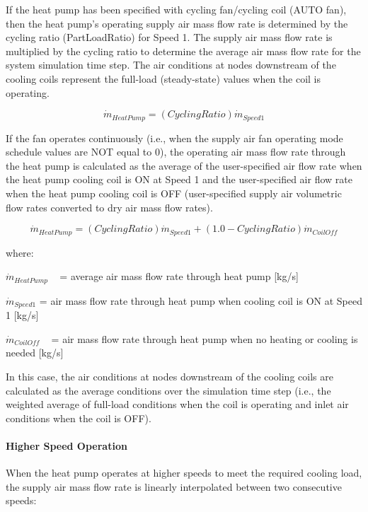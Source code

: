 If the heat pump has been specified with cycling fan/cycling coil (AUTO fan), then the heat pump's operating supply air mass flow rate is determined by the cycling ratio (PartLoadRatio) for Speed 1. The supply air mass flow rate is multiplied by the cycling ratio to determine the average air mass flow rate for the system simulation time step. The air conditions at nodes downstream of the cooling coils represent the full-load (steady-state) values when the coil is operating.

\begin{equation}
{\dot m_{HeatPump}} = (CyclingRatio){\dot m_{Speed1}}
\end{equation}

If the fan operates continuously (i.e., when the supply air fan operating mode schedule values are NOT equal to 0), the operating air mass flow rate through the heat pump is calculated as the average of the user-specified air flow rate when the heat pump cooling coil is ON at Speed 1 and the user-specified air flow rate when the heat pump cooling coil is OFF (user-specified supply air volumetric flow rates converted to dry air mass flow rates).

\begin{equation}
{\dot m_{HeatPump}} = (CyclingRatio){\dot m_{Speed1}} + (1.0 - CyclingRatio){\dot m_{CoilOff}}
\end{equation}

where:

\({\dot m_{HeatPump}}\) ~ = average air mass flow rate through heat pump {[}kg/s{]}

\({{{\dot m}_{Speed1}}}\) = air mass flow rate through heat pump when cooling coil is ON at Speed 1 {[}kg/s{]}

\({{{\dot m}_{CoilOff}}}\) ~ = air mass flow rate through heat pump when no heating or cooling is needed {[}kg/s{]}

In this case, the air conditions at nodes downstream of the cooling coils are calculated as the average conditions over the simulation time step (i.e., the weighted average of full-load conditions when the coil is operating and inlet air conditions when the coil is OFF).

\paragraph{Higher Speed Operation}\label{higher-speed-operation-1}

When the heat pump operates at higher speeds to meet the required cooling load, the supply air mass flow rate is linearly interpolated between two consecutive speeds:

